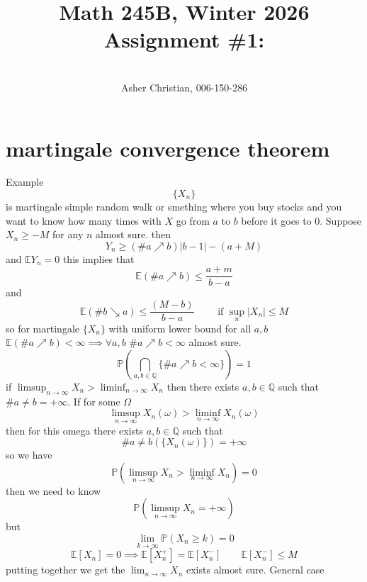 \documentclass[11pt]{article}
\newcommand{\cnum}{Math 245B}
\newcommand{\ced}{Winter 2026}
\newcommand{\ctitle}[4]{\title{\vspace{-0.5in}\cnum, \ced\\Assignment #1: #2}\author{\vspace{-0.35in}\\#3, #4}}
\begin{document}
\ctitle{\#1}{}{Asher Christian}{006-150-286}
\date{}
\maketitle

\section{martingale convergence theorem}
Example
\[
    \{X_n\}
\] 
is martingale simple random walk or smething where you buy stocks and you want to know how many times with $X$ go from  $a$ to  $b$
before it goes to 0.
Suppose  $X_n \ge -M$ for any  $n$ almost sure. then
 \[
Y_n \ge (\# a \nearrow b) |b-1| - (a +M)
\] 
and $ \mathbb{E}Y_n = 0$
this implies that
\[
\mathbb{E}(\# a \nearrow b) \le \frac{a+m}{b-a}
\] 
and
\[
    \mathbb{E}(\# b \searrow a) \le  \frac{(M-b)}{b-a} \qquad \text{ if } \sup_{n}|X_n| \le M
\] 
so for martingale $\{X_n\}$ with uniform lower bound for all $a,b$  $ \mathbb{E}(\# a \nearrow b) < \infty \implies \forall a,b$ $ \# a \nearrow b < \infty$ almost sure.
\[
   \mathbb{P}( \bigcap_{a,b \in \mathbb{Q}}\{ \# a \nearrow b < \infty\} ) = 1
\] 
if $\limsup_{n\to \infty}X_n > \liminf_{n\to \infty}X_n$ then there exists $a,b \in \mathbb{Q}$ such that $\# a \ne b = +\infty$.
If for some $\Omega$
 \[
\limsup_{n\to \infty} X_n(\omega) > \liminf_{n\to \infty} X_n(\omega)
\] 
then for this omega there exists $a,b \in \mathbb{Q}$ such that
\[
    \# a \ne b (\{X_n(\omega)\}) = +\infty
\] 
so we have
\[
\mathbb{P}(\limsup_{n\to \infty} X_n > \liminf_{n\to \infty}X_n) = 0
\] 
then we need to know
\[
\mathbb{P}(\limsup_{n\to \infty}X_n = +\infty)
\] 
but
\[
\lim_{k\to \infty} \mathbb{P}(X_n \ge k) = 0
\] 
\[
    \mathbb{E}[X_n] = 0 \implies \mathbb{E}[X_n^{+}] = \mathbb{E}[X_n^{-}] \qquad \mathbb{E}[X_n^{-}] \le M
\] 
putting together we get the $\lim_{n\to \infty}X_n$ exists almost sure.
General case 
\end{document}
